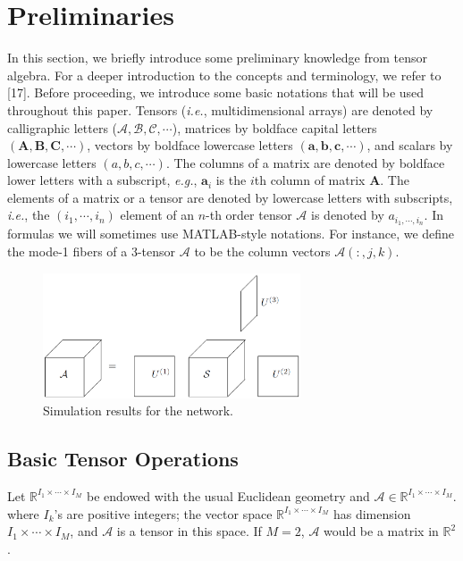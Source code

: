 \documentclass[journal]{IEEEtran}
\begin{document}
	\section{Preliminaries} \label{Chap_3}
	In this section, we briefly introduce some preliminary knowledge from tensor algebra. For a deeper introduction
	to the concepts and terminology, we refer to [17]. Before proceeding, we introduce some basic notations that will be used throughout this paper.
	Tensors (\textit{i.e.}, multidimensional arrays) are denoted by
	calligraphic letters ($\mathcal{A}, \mathcal{B}, \mathcal{C}, \cdots$), matrices by boldface
	capital letters $(\boldsymbol{A, B, C, \cdots})$, vectors by boldface lowercase letters $(\boldsymbol{a, b, c, \cdots})$, and scalars by lowercase
	letters $(a, b, c, \cdots)$. The columns of a matrix are denoted by boldface lower letters with a subscript, \textit{e.g.}, $\boldsymbol{a}_{i}$
	is the $i$th column of matrix $\boldsymbol{A}$. The elements of a
	matrix or a tensor are denoted by lowercase letters with
	subscripts, \textit{i.e.}, the $(i_1, \cdots, i_n)$ element of an $n$-th order
	tensor $\mathcal{A}$ is denoted by $a_{i_1, \cdots, i_n}$. In formulas we will sometimes
	use MATLAB-style notations. For instance, we define
	the mode-1 fibers of a 3-tensor $\mathcal{A}$ to be the column vectors $\mathcal{A}(:, j, k)$.
	
	\begin{figure}[!t]
		\centering
		\includegraphics[width=3in]{HOSVD}
		
		\caption{Simulation results for the network.}
		\label{g2.1}
	\end{figure}
	
	\subsection{Basic Tensor Operations}
	Let $\mathbb{R}^{I_1\times \cdots \times  I_M}$ be endowed with the usual Euclidean geometry and $\mathcal{A}  \in \mathbb{R}^{I_1\times \cdots \times  I_M}$. where $I_k$'s are positive integers; the vector space $\mathbb{R}^{I_1\times \cdots \times  I_M}$
	has dimension ${I_1\times \cdots \times  I_M}$, and $\mathcal{A}$ is a tensor in this space. If $M = 2$, $\mathcal{A}$ would be a matrix in $\mathbb{R}^2$.
	
\end{document}
